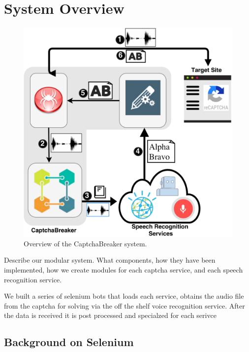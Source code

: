 \section{System Overview}
\label{sec:system}

\begin{figure}
\centering
\includegraphics[width=\columnwidth]{figures/breaker_arch.pdf}
\caption{Overview of the CaptchaBreaker system.}
\label{fig:breaker}
\end{figure}

Describe our modular system. What components, how they have been implemented, 
how we create modules for each captcha service, and each speech recognition service.


We built a series of selenium bots that loads each service, obtains the audio file from the captcha for solving via the off the shelf voice recognition service. After the data is received it is post processed and specialzed for each serivce 


\subsection{Background on Selenium} 


